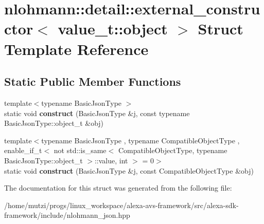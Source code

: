 \hypertarget{structnlohmann_1_1detail_1_1external__constructor_3_01value__t_1_1object_01_4}{}\section{nlohmann\+:\+:detail\+:\+:external\+\_\+constructor$<$ value\+\_\+t\+:\+:object $>$ Struct Template Reference}
\label{structnlohmann_1_1detail_1_1external__constructor_3_01value__t_1_1object_01_4}
\subsection*{Static Public Member Functions}
\begin{DoxyCompactItemize}
\item 
\mbox{\label{structnlohmann_1_1detail_1_1external__constructor_3_01value__t_1_1object_01_4_a3a369c5d49596dd4411e368425f9ac7a}} 
{\footnotesize template$<$typename Basic\+Json\+Type $>$ }\\static void {\bfseries construct} (Basic\+Json\+Type \&j, const typename Basic\+Json\+Type\+::object\+\_\+t \&obj)
\item 
\mbox{\label{structnlohmann_1_1detail_1_1external__constructor_3_01value__t_1_1object_01_4_a91f89abe0ec4dec59099b691682ff927}} 
{\footnotesize template$<$typename Basic\+Json\+Type , typename Compatible\+Object\+Type , enable\+\_\+if\+\_\+t$<$ not std\+::is\+\_\+same$<$ Compatible\+Object\+Type, typename Basic\+Json\+Type\+::object\+\_\+t $>$\+::value, int $>$  = 0$>$ }\\static void {\bfseries construct} (Basic\+Json\+Type \&j, const Compatible\+Object\+Type \&obj)
\end{DoxyCompactItemize}


The documentation for this struct was generated from the following file\+:\begin{DoxyCompactItemize}
\item 
/home/mutzi/progs/linux\+\_\+workspace/alexa-\/avs-\/framework/src/alexa-\/sdk-\/framework/include/nlohmann\+\_\+json.\+hpp\end{DoxyCompactItemize}
